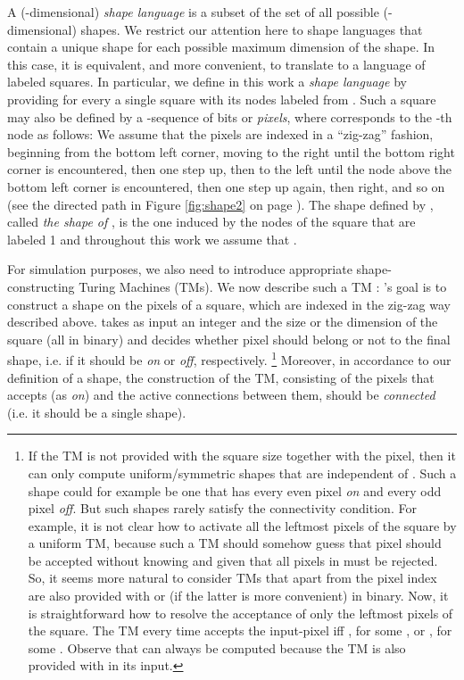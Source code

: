 \documentclass[oribibl, 11pt]{llncs}
\begin{document}
A (-dimensional) \emph{shape language}  is a subset of the set of all possible (-dimensional) shapes. We restrict our attention here to shape languages that contain a unique shape for each possible maximum dimension of the shape. In this case, it is equivalent, and more convenient, to translate  to a language of labeled squares. In particular, we define in this work a \emph{shape language}  by providing for every  a single  square with its nodes labeled from . Such a square may also be defined by a -sequence  of bits or \emph{pixels}, where  corresponds to the -th node as follows: We assume that the pixels are indexed in a ``zig-zag'' fashion, beginning from the bottom left corner, moving to the right until the bottom right corner is encountered, then one step up, then to the left until the node above the bottom left corner is encountered, then one step up again, then right, and so on (see the directed path in Figure \ref{fig:shape2} on page \pageref{fig:shape2}). The shape  defined by , called \emph{the shape of }, is the one induced by the nodes of the square that are labeled 1 and throughout this work we assume that .  

For simulation purposes, we also need to introduce appropriate shape-constructing Turing Machines (TMs). We now describe such a TM : 's goal is to construct a shape on the pixels of a  square, which are indexed in the zig-zag way described above.  takes as input an integer  and the size  or the dimension  of the square (all in binary) and decides whether pixel  should belong or not to the final shape, i.e. if it should be \emph{on} or \emph{off}, respectively. \footnote{If the TM is not provided with the square size together with the pixel, then it can only compute uniform/symmetric shapes that are independent of . Such a shape could for example be one that has every even pixel \emph{on} and every odd pixel \emph{off}. But such shapes rarely satisfy the connectivity condition. For example, it is not clear how to activate all the leftmost pixels of the square by a uniform TM, because such a TM should somehow guess that pixel  should be accepted without knowing  and given that all pixels in  must be rejected. So, it seems more natural to consider TMs that apart from the pixel index are also provided with  or  (if the latter is more convenient) in binary. Now, it is straightforward how to resolve the acceptance of only the leftmost pixels of the square. The TM every time accepts the input-pixel  iff , for some , or , for some . Observe that  can always be computed because the TM is also provided with  in its input.} Moreover, in accordance to our definition of a shape, the construction of the TM, consisting of the pixels that  accepts (as \emph{on}) and the active connections between them, should be \emph{connected} (i.e. it should be a single shape).
\end{document}
